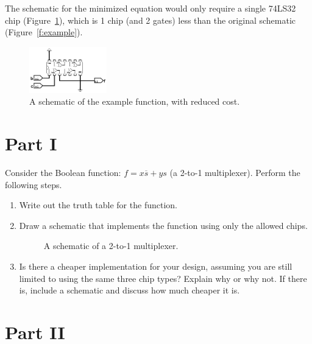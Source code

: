\documentclass{article}
\begin{document}
\begin{enumerate}
The schematic for the minimized equation would only require a single 74LS32 chip (Figure~\ref{f:example_reduced}), which is 1 chip (and 2 gates) less than the original schematic (Figure~\ref{f:example}).

\begin{figure}[!ht]
    \centering
    \includegraphics[width=0.3\textwidth]{example_reduced.png}
    \caption{A schematic of the example function, with reduced cost.}
    \label{f:example_reduced}
\end{figure}
\end{enumerate}

\newpage
\section*{Part I}

Consider the Boolean function: $f = x\overline{s}+ys$ (a 2-to-1 multiplexer).
Perform the following steps.

\begin{enumerate}

\item Write out the truth table for the function.

\item Draw a schematic that implements the function using only the allowed chips.

\begin{figure}[!ht]
    \centering
    \caption{A schematic of a 2-to-1 multiplexer.}
    \label{f:part1}
\end{figure}

\item Is there a cheaper implementation for your design, assuming you are still limited to using the same three chip types?
    Explain why or why not.
    If there is, include a schematic and discuss how much cheaper it is.

\end{enumerate}

\newpage
\section*{Part II}
\end{document}
